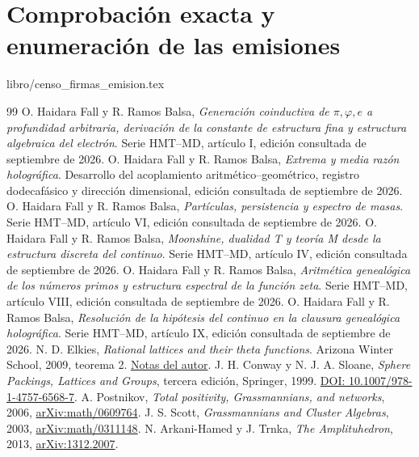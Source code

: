 \documentclass[a4paper,10pt]{article}
\theoremstyle{definition}\newtheorem{definition}[theorem]{Definición}
\theoremstyle{remark}\newtheorem{remark}[theorem]{Observación}
\numberwithin{equation}{section}
\begin{document}
\clearpage
\part{Comprobación exacta y enumeración de las emisiones}

{libro/censo_firmas_emision.tex}


\begin{thebibliography}{99}
 O. Haidara Fall y R. Ramos Balsa,
\emph{Generación coinductiva de \(\pi,\varphi,e\) a profundidad arbitraria,
derivación de la constante de estructura fina y estructura algebraica del
electrón}. Serie HMT--MD, artículo I, edición consultada de septiembre de 2026.
 O. Haidara Fall y R. Ramos Balsa,
\emph{Extrema y media razón holográfica}. Desarrollo del acoplamiento
aritmético--geométrico, registro dodecafásico y dirección dimensional,
edición consultada de septiembre de 2026.
 O. Haidara Fall y R. Ramos Balsa,
\emph{Partículas, persistencia y espectro de masas}. Serie HMT--MD, artículo VI,
edición consultada de septiembre de 2026.
 O. Haidara Fall y R. Ramos Balsa,
\emph{Moonshine, dualidad T y teoría M desde la estructura discreta del
continuo}. Serie HMT--MD, artículo IV, edición consultada de septiembre de 2026.
 O. Haidara Fall y R. Ramos Balsa,
\emph{Aritmética genealógica de los números primos y estructura espectral
de la función zeta}. Serie HMT--MD, artículo VIII, edición consultada de septiembre de 2026.
 O. Haidara Fall y R. Ramos Balsa,
\emph{Resolución de la hipótesis del continuo en la clausura genealógica
holográfica}. Serie HMT--MD, artículo IX, edición consultada de septiembre de 2026.
 N. D. Elkies,
\emph{Rational lattices and their theta functions}. Arizona Winter School,
2009, teorema 2.
\href{https://people.math.harvard.edu/~elkies/aws09.pdf}{Notas del autor}.
 J. H. Conway y N. J. A. Sloane,
\emph{Sphere Packings, Lattices and Groups}, tercera edición, Springer, 1999.
\href{https://doi.org/10.1007/978-1-4757-6568-7}{DOI: 10.1007/978-1-4757-6568-7}.
 A. Postnikov,
\emph{Total positivity, Grassmannians, and networks}, 2006,
\href{https://arxiv.org/abs/math/0609764}{arXiv:math/0609764}.
 J. S. Scott,
\emph{Grassmannians and Cluster Algebras}, 2003,
\href{https://arxiv.org/abs/math/0311148}{arXiv:math/0311148}.
 N. Arkani-Hamed y J. Trnka,
\emph{The Amplituhedron}, 2013,
\href{https://arxiv.org/abs/1312.2007}{arXiv:1312.2007}.

\end{thebibliography}
\end{document}
